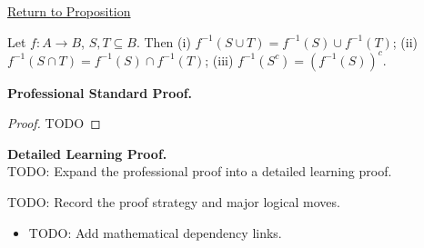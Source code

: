 \newpage
{}
\label{prf:preimage-union-intersection}

\begin{remark*}[Return]
\hyperref[prop:preimage-union-intersection]{Return to Proposition}
\end{remark*}

\begin{proposition*}
Let $f:A\to B$, $S,T\subseteq B$. Then (i) $f^{-1}(S\cup T)=f^{-1}(S)\cup f^{-1}(T)$; (ii) $f^{-1}(S\cap T)=f^{-1}(S)\cap f^{-1}(T)$; (iii) $f^{-1}(S^c)=(f^{-1}(S))^c$.
\end{proposition*}

\textbf{Professional Standard Proof.}~\\
\begin{proof}
TODO
\end{proof}

\textbf{Detailed Learning Proof.}~\\
TODO: Expand the professional proof into a detailed learning proof.

\begin{remark*}
TODO: Record the proof strategy and major logical moves.
\end{remark*}

\begin{dependencies}
\begin{itemize}
  \item TODO: Add mathematical dependency links.
\end{itemize}
\end{dependencies}
